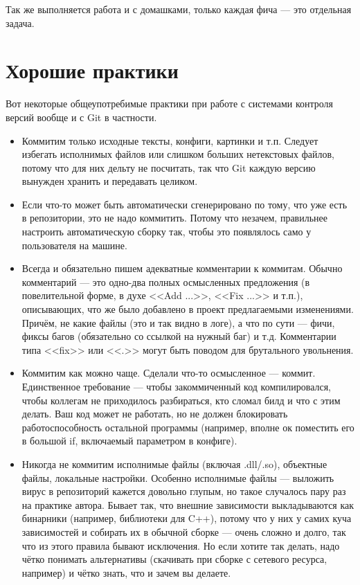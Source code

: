 \documentclass{../../text-style}
\begin{document}
Так же выполняется работа и с домашками, только каждая фича --- это отдельная задача.

\section{Хорошие практики}

Вот некоторые общеупотребимые практики при работе с системами контроля версий вообще и с Git в частности.

\begin{itemize}
    \item Коммитим только исходные тексты, конфиги, картинки и т.п. Следует избегать исполнимых файлов или слишком больших нетекстовых файлов, потому что для них дельту не посчитать, так что Git каждую версию вынужден хранить и передавать целиком.
    \item Если что-то может быть автоматически сгенерировано по тому, что уже есть в репозитории, это не надо коммитить. Потому что незачем, правильнее настроить автоматическую сборку так, чтобы это появлялось само у пользователя на машине.
    \item Всегда и обязательно пишем адекватные комментарии к коммитам. Обычно комментарий --- это одно-два полных осмысленных предложения (в повелительной форме, в духе <<Add ...>>, <<Fix ...>> и т.п.), описывающих, что же было добавлено в проект предлагаемыми изменениями. Причём, не какие файлы (это и так видно в логе), а что по сути --- фичи, фиксы багов (обязательно со ссылкой на нужный баг) и т.д. Комментарии типа <<fix>> или <<.>> могут быть поводом для брутального увольнения.
    \item Коммитим как можно чаще. Сделали что-то осмысленное --- коммит. Единственное требование --- чтобы закоммиченный код компилировался, чтобы коллегам не приходилось разбираться, кто сломал билд и что с этим делать. Ваш код может не работать, но не должен блокировать работоспособность остальной программы (например, вполне ок поместить его в большой if, включаемый параметром в конфиге).
    \item Никогда не коммитим исполнимые файлы (включая .dll/.so), объектные файлы, локальные настройки. Особенно исполнимые файлы --- выложить вирус в репозиторий кажется довольно глупым, но такое случалось пару раз на практике автора. Бывает так, что внешние зависимости выкладываются как бинарники (например, библиотеки для C++), потому что у них у самих куча зависимостей и собирать их в обычной сборке --- очень сложно и долго, так что из этого правила бывают исключения. Но если хотите так делать, надо чётко понимать альтернативы (скачивать при сборке с сетевого ресурса, например) и чётко знать, что и зачем вы делаете.

\end{itemize}
\end{document}
